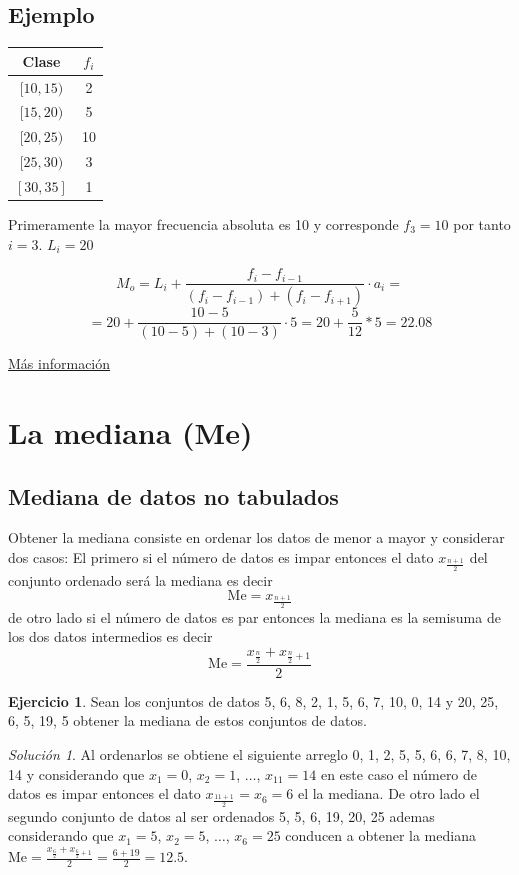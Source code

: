 \documentclass[10pt,]{krantz}
\theoremstyle{definition}
\theoremstyle{definition}
\theoremstyle{definition}
\newtheorem{exercise}{Ejercicio}[chapter]
\theoremstyle{definition}
\theoremstyle{remark}
\newtheorem*{solution}{Solución}
\begin{document}
\hypertarget{ejemplo-1}{%
\subsection{Ejemplo}\label{ejemplo-1}}

\begin{longtable}[]{@{}cc@{}}
\toprule
Clase & \(f_i\)\tabularnewline
\midrule
\endhead
\([10,15)\) & 2\tabularnewline
\([15,20)\) & 5\tabularnewline
\([20,25)\) & 10\tabularnewline
\([25,30)\) & 3\tabularnewline
\([30,35]\) & 1\tabularnewline
\bottomrule
\end{longtable}

Primeramente la mayor frecuencia absoluta es 10 y corresponde \(f_3=10\) por tanto \(i=3\). \(L_i=20\)

\[ M_o=L_i+\frac{f_i-f_{i-1}}{(f_i-f_{i-1})+(f_i-f_{i+1})}\cdot a_i=\] \[ =20+\frac{10-5}{(10-5)+(10-3)}\cdot 5=20+\frac{5}{12}*5=22.08\]

\href{https://www.superprof.es/apuntes/escolar/matematicas/estadistica/descriptiva/moda-estadistica.html}{Más información}

\hypertarget{la-mediana-me}{%
\section{La mediana (Me)}\label{la-mediana-me}}

\hypertarget{mediana-de-datos-no-tabulados}{%
\subsection{Mediana de datos no tabulados}\label{mediana-de-datos-no-tabulados}}

Obtener la mediana consiste en ordenar los datos de menor a mayor y considerar dos casos: El primero si el número de datos es impar entonces el dato \(x_{\frac{n+1}{2}}\) del conjunto ordenado será la mediana es decir \[\text{Me}=x_{\frac{n+1}{2}}\] de otro lado si el número de datos es par entonces la mediana es la semisuma de los dos datos intermedios es decir \[\text{Me}=\frac{x_{\frac{n}{2}}+x_{\frac{n}{2}+1}}{2}\]

\begin{exercise}
\protect\hypertarget{exr:unnamed-chunk-12}{}{\label{exr:unnamed-chunk-12} }Sean los conjuntos de datos 5, 6, 8, 2, 1, 5, 6, 7, 10, 0, 14 y 20, 25, 6, 5, 19, 5 obtener la mediana de estos conjuntos de datos.
\end{exercise}

\begin{solution}
{}Al ordenarlos se obtiene el siguiente arreglo 0, 1, 2, 5, 5, 6, 6, 7, 8, 10, 14 y considerando que \(x_1=0\), \(x_2=1\), \(\ldots\), \(x_{11}=14\) en este caso el número de datos es impar entonces el dato \(x_{\frac{11+1}{2}}=x_{6}=6\) el la mediana. De otro lado el segundo conjunto de datos al ser ordenados 5, 5, 6, 19, 20, 25 ademas considerando que \(x_1=5\), \(x_2=5\), \(\ldots\), \(x_6=25\) conducen a obtener la mediana \(\text{Me}=\frac{x_{\frac{6}{2}}+x_{\frac{6}{2}+1}}{2}=\frac{6+19}{2}=12.5\).
\end{solution}
\end{document}
